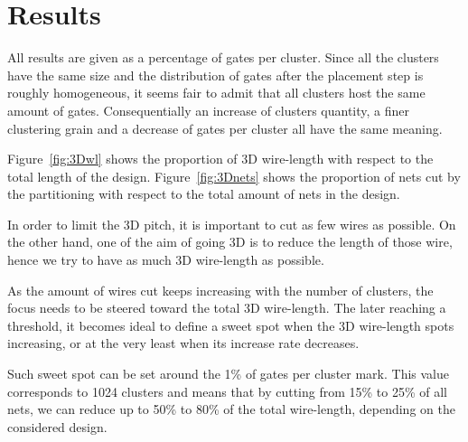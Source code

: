 \documentclass[conference]{IEEEtran}
\begin{document}
\newpage
\section{Results}\label{sec:res}

All results are given as a percentage of gates per cluster.
Since all the clusters have the same size and the distribution of gates after the placement step is roughly homogeneous, it seems fair to admit that all clusters host the same amount of gates.
Consequentially an increase of clusters quantity, a finer clustering grain and a decrease of gates per cluster all have the same meaning.

Figure~\ref{fig:3Dwl} shows the proportion of 3D wire-length with respect to the total length of the design.
Figure~\ref{fig:3Dnets} shows the proportion of nets cut by the partitioning with respect to the total amount of nets in the design.

In order to limit the 3D pitch, it is important to cut as few wires as possible.
On the other hand, one of the aim of going 3D is to reduce the length of those wire, hence we try to have as much 3D wire-length as possible.

As the amount of wires cut keeps increasing with the number of clusters, the focus needs to be steered toward the total 3D wire-length.
The later reaching a threshold, it becomes ideal to define a sweet spot when the 3D wire-length spots increasing, or at the very least when its increase rate decreases.

Such sweet spot can be set around the 1\% of gates per cluster mark.
This value corresponds to 1024 clusters and means that by cutting from 15\% to 25\% of all nets, we can reduce up to 50\% to 80\% of the total wire-length, depending on the considered design.


\end{document}
